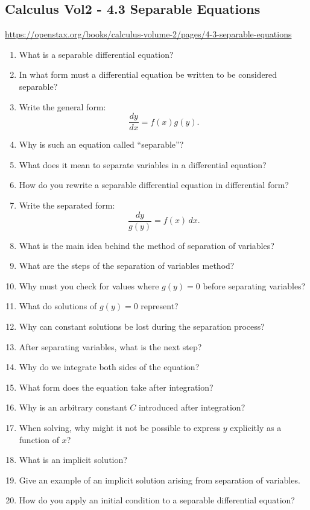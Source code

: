 \subsection{Calculus Vol2 - 4.3 Separable Equations}

\url{https://openstax.org/books/calculus-volume-2/pages/4-3-separable-equations}

\begin{enumerate}
  \item What is a separable differential equation?
  \item In what form must a differential equation be written to be considered separable?
  \item Write the general form:
    \[ \frac{dy}{dx}= f(x)g(y). \]
  \item Why is such an equation called “separable”?
  \item What does it mean to separate variables in a differential equation?
  \item How do you rewrite a separable differential equation in differential form?
  \item Write the separated form:
    \[ \frac{dy}{g(y)}= f(x)\,dx. \]
  \item What is the main idea behind the method of separation of variables?
  \item What are the steps of the separation of variables method?
  \item Why must you check for values where \(g(y)=0\) before separating variables?
  \item What do solutions of \(g(y)=0\) represent?
  \item Why can constant solutions be lost during the separation process?
  \item After separating variables, what is the next step?
  \item Why do we integrate both sides of the equation?
  \item What form does the equation take after integration?
  \item Why is an arbitrary constant \(C\) introduced after integration?
  \item When solving, why might it not be possible to express \(y\) explicitly as a function of \(x\)?
  \item What is an implicit solution?
  \item Give an example of an implicit solution arising from separation of variables.
  \item How do you apply an initial condition to a separable differential equation?

\end{enumerate}
